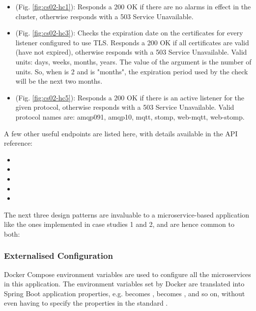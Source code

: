 \begin{itemize}
  \item {} (Fig. \ref{fig:cs02-hc1}): Responds a 200 OK if there are no alarms in effect in the cluster, otherwise responds with a 503 Service Unavailable.
  \item {} (Fig. \ref{fig:cs02-hc3}):  Checks the expiration date on the certificates for every listener configured to use TLS. Responds a 200 OK if all certificates are valid (have not expired), otherwise responds with a 503 Service Unavailable. Valid units: days, weeks, months, years. The value of the  argument is the number of units. So, when  is 2 and  is "months", the expiration period used by the check will be the next two months.
  \item {} (Fig. \ref{fig:cs02-hc5}): Responds a 200 OK if there is an active listener for the given protocol, otherwise responds with a 503 Service Unavailable. Valid protocol names are: amqp091, amqp10, mqtt, stomp, web-mqtt, web-stomp.
\end{itemize}

A few other useful endpoints are listed here, with details available in the API reference:
\begin{itemize}
  \item {}
  \item {}
  \item {}
  \item {}
  \item {}
\end{itemize}


The next three design patterns are invaluable to a microservice-based application like the ones implemented in case studies 1 and 2, and are hence common to both:

\subsubsection{Externalised Configuration}

Docker Compose environment variables are used to configure all the microservices in this application. The environment variables set by Docker are translated into Spring Boot application properties, e.g.  becomes ,  becomes , and so on, without even having to specify the properties in the standard .

